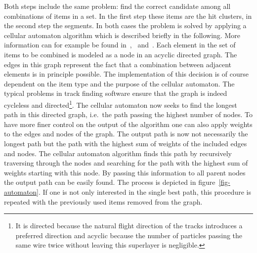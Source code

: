Both steps include the same problem: find the correct candidate among all combinations of items in a set. In the first step these items are the hit clusters, in the second step the segments. In both cases the problem is solved by applying a cellular automaton algorithm which is described briefly in the following. More information can for example be found in~\cite{cats},~\cite{kisel} and~\cite{oliver}. Each element in the set of items to be combined is modeled as a node in an acyclic directed graph. The edges in this graph represent the fact that a combination between adjacent elements is in principle possible. The implementation of this decision is of course dependent on the item type and the purpose of the cellular automaton. The typical problems in track finding software ensure that the graph is indeed cycleless and directed\footnote{It is directed because the natural flight direction of the tracks introduces a preferred direction and acyclic because the number of particles passing the same wire twice without leaving this superlayer is negligible.}. The cellular automaton now seeks to find the longest path in this directed graph, i.e.\ the path passing the highest number of nodes. To have more finer control on the output of the algorithm one can also apply weights to the edges and nodes of the graph. The output path is now not necessarily the longest path but the path with the highest sum of weights of the included edges and nodes. The cellular automaton algorithm finds this path by recursively traversing through the nodes and searching for the path with the highest sum of weights starting with this node. By passing this information to all parent nodes the output path can be easily found. The process is depicted in figure~\ref{fig-automaton}. If one is not only interested in the single best path, this procedure is repeated with the previously used items removed from the graph.


